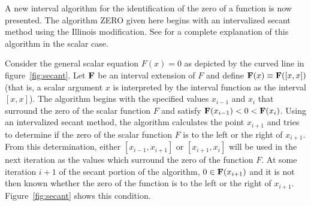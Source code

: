 \documentclass[10pt,letterpaper]{article}
\begin{document}
A new interval algorithm for the identification of the zero of a function is
now presented.  The algorithm ZERO given here
begins with an intervalized secant method using the Illinois
modification.  See \cite{Thisted} for a complete explanation of this
algorithm in the scalar case.   

Consider the general scalar equation $F(x) = 0$ as depicted by the curved line
in figure~\ref{fig:secant}.  Let ${\bf F}$ be an interval extension of $F$ and
define ${\bf F}(x) \equiv 
{\bf F}([x,x])$ (that is, a scalar argument $x$ is interpreted by the 
interval function as the interval $[x,x]$).
The algorithm begins with the specified
values $x_{i-1}$ and $x_i$ that surround the
zero of the scalar function $F$ and satisfy
${\bf F}(x_{i-1})< 0 < {\bf F}(x_{i})$.  
Using an intervalized secant method, the algorithm 
calculates the point $x_{i+1}$ and tries to determine if the zero of the
scalar function $F$ is to the left or the right of $x_{i+1}$.  
From this determination, either $[x_{i-1},x_{i+1}]$ or $[x_{i+1},x_i]$ will be
used in the next iteration as the values which surround the zero of the
function $F$.
At some iteration $i+1$ of the secant portion of the algorithm,
$0 \in {\bf F}(x_{i+1})$
and it is not then known whether the zero of the function
is to the left
or the right of $x_{i+1}$.   Figure~\ref{fig:secant} shows this condition.
\end{document}
